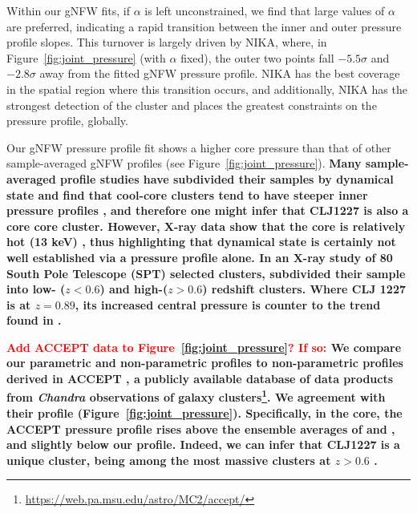 \documentclass[twocolumn,traditabstract]{aa}
\begin{document}
Within our gNFW fits, if $\alpha$ is left unconstrained, we find that large values of $\alpha$ are preferred, indicating a
rapid transition between the inner and outer pressure profile slopes. This turnover is largely driven by NIKA, where, in
Figure~\ref{fig:joint_pressure} (with $\alpha$ fixed), the outer two points fall $-5.5\sigma$ and $-2.8\sigma$ away from
the fitted gNFW pressure profile. NIKA has the best coverage in the spatial region where this transition occurs, and additionally,
NIKA has the strongest detection of the cluster and places the greatest constraints on the pressure profile, globally.



Our gNFW pressure profile fit shows a higher core pressure than that of other sample-averaged gNFW profiles
(see Figure~\ref{fig:joint_pressure}). \textbf{Many sample-averaged profile studies have subdivided their
  samples by dynamical state and find that cool-core clusters tend to have steeper inner pressure profiles
  \citep[e.g.][]{arnaud2010,planck2013,sayers2013a,romero2017}, and therefore
one might infer that CLJ1227 is also a core core cluster. However, X-ray data show that the core is relatively hot \textbf{(13 keV)}
\citep{maughan2007}, thus highlighting that dynamical state is certainly not well established via a pressure profile alone.
In an X-ray study of 80 South Pole Telescope (SPT) selected clusters, \citet{mcdonald2014} subdivided their sample into
low- ($z < 0.6$) and high-($z > 0.6$) redshift clusters. Where CLJ 1227 is at $z=0.89$, its increased central pressure is
counter to the trend found in \citet{mcdonald2014}.}

\textbf{ \textcolor{red}{Add ACCEPT data to Figure~\ref{fig:joint_pressure}? If so:} We compare our parametric and non-parametric profiles to non-parametric profiles derived in ACCEPT \citep{cavagnolo2009}, a publicly available database of data products from \emph{Chandra} observations of galaxy clusters\footnote{\url{https://web.pa.msu.edu/astro/MC2/accept/}}. We agreement with their profile (Figure~\ref{fig:joint_pressure}). Specifically, in the core, the ACCEPT pressure profile rises above the ensemble averages of \citet{planck2013} and \citet{arnaud2010}, and slightly below our profile. Indeed, we can infer that CLJ1227 is a unique cluster, being among the most massive clusters at $z > 0.6$ \citep[e.g.][]{menanteau2012}.}
\end{document}
